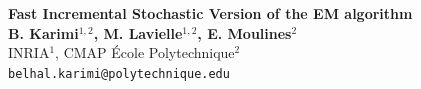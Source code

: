 \documentclass[a0,portrait]{a0poster}
\begin{document}
{}


\begin{minipage}[b]{0.7\linewidth}
\veryHuge \color{Navy} \textbf{Fast Incremental Stochastic Version of the EM algorithm} \color{Black}\\[2cm] %
\huge \textbf{B. Karimi$^{1,2}$, M. Lavielle$^{1,2}$, E. Moulines$^{2}$}\\[0.5cm] %
\huge INRIA$^1$, CMAP École Polytechnique$^2$\\[0.4cm] %
\Large \texttt{belhal.karimi@polytechnique.edu}

\end{minipage}
%
\end{document}
